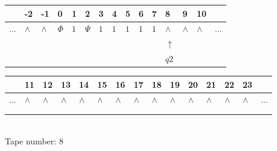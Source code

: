 \documentclass[11pt]{article}
\begin{document}
\begin{table}[H]
\centering
\begin{tabular}{lllllllllllllll}
 & -2 & -1 & 0 & 1 & 2 & 3 & 4 & 5 & 6 & 7 & 8 & 9 & 10 & \\
\hline
$...$ & \multicolumn{1}{|l|}{$\wedge$} & \multicolumn{1}{|l|}{$\wedge$} & \multicolumn{1}{|l|}{$\Phi$} & \multicolumn{1}{|l|}{$1$} & \multicolumn{1}{|l|}{$\Psi$} & \multicolumn{1}{|l|}{$1$} & \multicolumn{1}{|l|}{$1$} & \multicolumn{1}{|l|}{$1$} & \multicolumn{1}{|l|}{$1$} & \multicolumn{1}{|l|}{$1$} & \multicolumn{1}{|l|}{$\wedge$} & \multicolumn{1}{|l|}{$\wedge$} & \multicolumn{1}{|l|}{$\wedge$} & $...$\\
\hline
&  &  &  &  &  &  &  &  &  &  & $\uparrow$ &  &  &  \\
&  &  &  &  &  &  &  &  &  &  & $ q2 $ &  &  &  \\
\end{tabular}
\begin{tabular}{lllllllllllllll}
 & 11 & 12 & 13 & 14 & 15 & 16 & 17 & 18 & 19 & 20 & 21 & 22 & 23 & \\
\hline
$...$ & \multicolumn{1}{|l|}{$\wedge$} & \multicolumn{1}{|l|}{$\wedge$} & \multicolumn{1}{|l|}{$\wedge$} & \multicolumn{1}{|l|}{$\wedge$} & \multicolumn{1}{|l|}{$\wedge$} & \multicolumn{1}{|l|}{$\wedge$} & \multicolumn{1}{|l|}{$\wedge$} & \multicolumn{1}{|l|}{$\wedge$} & \multicolumn{1}{|l|}{$\wedge$} & \multicolumn{1}{|l|}{$\wedge$} & \multicolumn{1}{|l|}{$\wedge$} & \multicolumn{1}{|l|}{$\wedge$} & \multicolumn{1}{|l|}{$\wedge$} & $...$\\
\hline
&  &  &  &  &  &  &  &  &  &  &  &  &  &  \\
&  &  &  &  &  &  &  &  &  &  &  &  &  &  \\
\end{tabular}
\\
Tape number: 8
\noindent\makebox[\linewidth]{\hdashrule{\textwidth}{1pt}{1pt}}\end{table}
\end{document}
